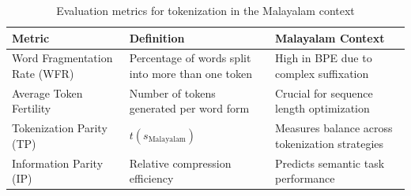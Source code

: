 \documentclass[12pt]{article}
\begin{document}
	
	\begin{table}[h]
		\centering
		\begin{tabularx}{\textwidth}{l X X}
			\toprule
			\textbf{Metric} & \textbf{Definition} & \textbf{Malayalam Context} \\
			\midrule
			
			Word Fragmentation Rate (WFR) 
			& Percentage of words split into more than one token 
			& High in BPE due to complex suffixation \\
			
			Average Token Fertility 
			& Number of tokens generated per word form 
			& Crucial for sequence length optimization \\
			
			Tokenization Parity (TP) 
			& $t(s_{\text{Malayalam}})$ 
			& Measures balance across tokenization strategies \\
			
			Information Parity (IP) 
			& Relative compression efficiency 
			& Predicts semantic task performance \\
			
			\bottomrule
		\end{tabularx}
		\caption{Evaluation metrics for tokenization in the Malayalam context}
	\end{table}
	
\end{document}
